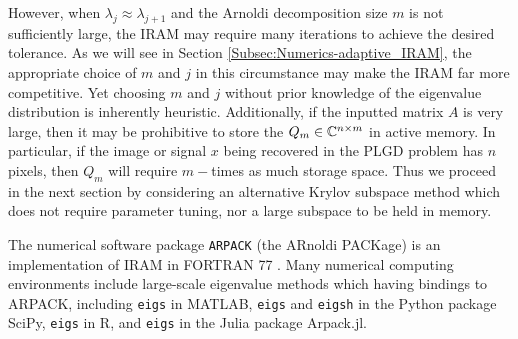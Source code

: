 However, when $\lambda_j \approx \lambda_{j+1}$ and the Arnoldi decomposition size $m$ is not sufficiently large, the IRAM may require many iterations to achieve the desired tolerance.  As we will see in Section \ref{Subsec:Numerics-adaptive_IRAM}, the appropriate choice of $m$ and $j$ in this circumstance may make the IRAM far more competitive.  Yet choosing $m$ and $j$ without prior knowledge of the eigenvalue distribution is inherently heuristic.  Additionally, if the inputted matrix $A$ is very large, then it may be prohibitive to store the $Q_m \in {\mathbb C}^{n \times m}$ in active memory.  In particular, if the image or signal $x$ being recovered in the PLGD problem has $n$ pixels, then $Q_m$ will require $m-$times as much storage space.  Thus we proceed in the next section by considering an alternative Krylov subspace method which does not require parameter tuning, nor a large subspace to be held in memory.


The numerical software package \texttt{ARPACK} (the ARnoldi PACKage) is an implementation of IRAM in FORTRAN 77 \cite{lehoucq1998arpack}.  Many numerical computing environments include large-scale eigenvalue methods which having bindings to ARPACK, including \texttt{eigs} in MATLAB, \texttt{eigs} and \texttt{eigsh} in the Python package SciPy, \texttt{eigs} in R, and \texttt{eigs} in the Julia package Arpack.jl. 




